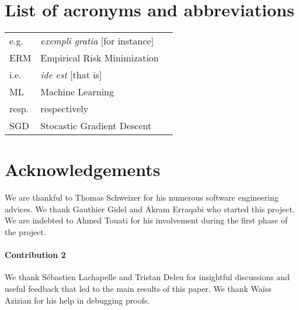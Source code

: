 \documentclass[12pt]{report} %
\numberwithin{equation}{chapter}
\numberwithin{table}{chapter}
\numberwithin{figure}{chapter}
\begin{document}

\cleardoublepage
{}  %
\tableofcontents
\cleardoublepage
{}  %
\listoftables
\cleardoublepage
{}
\listoffigures

\chapter*{List of acronyms and abbreviations}
\begin{tabular}{lll}
  e.g. & \emph{exempli gratia} [for instance]\\
  ERM & Empirical Risk Minimization     \\
  i.e.& \emph{ide est} [that is]\\
  ML & Machine Learning \\
  resp. & respectively \\
  SGD & Stocastic Gradient Descent \\ 
\end{tabular}


\chapter*{Acknowledgements}

We are thankful to Thomas Schweizer for his numerous software engineering advices.
We thank Gauthier Gidel and Akram Erraqabi who started this project.
We are indebted to Ahmed Touati for his involvement during the first phase of the project.


\subsubsection*{Contribution 2}
We thank S\'ebastien Lachapelle and Tristan Deleu for insightful discussions and useful feedback that led to the main results of this paper. 
We thank Waïss Azizian for his help in debugging proofs.
\end{document}
